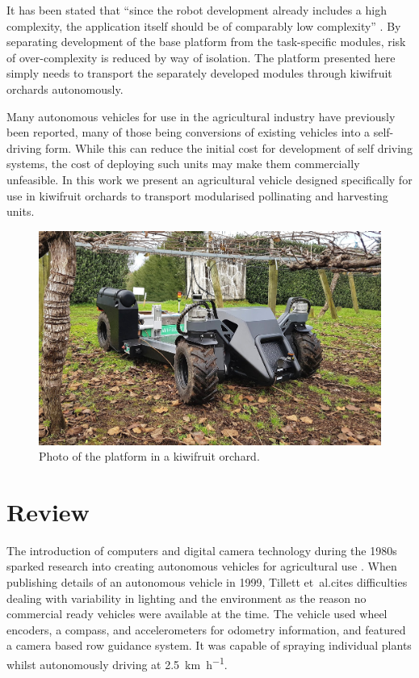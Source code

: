 \documentclass[preprint,authoryear,12pt]{elsarticle}
\begin{document}
    It has been stated that ``since the robot development already includes a high complexity, the application itself should be of comparably low complexity'' \citep{Ruckelshausen2009}.
    By separating development of the base platform from the task-specific modules, risk of over-complexity is reduced by way of isolation.
    The platform presented here simply needs to transport the separately developed modules through kiwifruit orchards autonomously.

    Many autonomous vehicles for use in the agricultural industry have previously been reported, many of those being conversions of existing vehicles into a self-driving form.
    While this can reduce the initial cost for development of self driving systems, the cost of deploying such units may make them commercially unfeasible.
    In this work we present an agricultural vehicle designed specifically for use in kiwifruit orchards to transport modularised pollinating and harvesting units.

    \begin{figure}[htb]
        \centering
        \includegraphics[width=\linewidth]{imgs/photos/suzy_general.jpg}
        \caption{
            Photo of the platform in a kiwifruit orchard.
        }
        \label{fig:suzy}
    \end{figure}

\section{Review}
\label{sect:review}

    The introduction of computers and digital camera technology during the 1980s sparked research into creating autonomous vehicles for agricultural use \cite{Li2009}.
    When publishing details of an autonomous vehicle in 1999, Tillett et~al.\@ cites difficulties dealing with variability in lighting and the environment as the reason no commercial ready vehicles were available at the time.
    The vehicle used wheel encoders, a compass, and accelerometers for odometry information, and featured a camera based row guidance system.
    It was capable of spraying individual plants whilst autonomously driving at \SI{2.5}{\kilo\meter\per\hour}.
    
\end{document}

